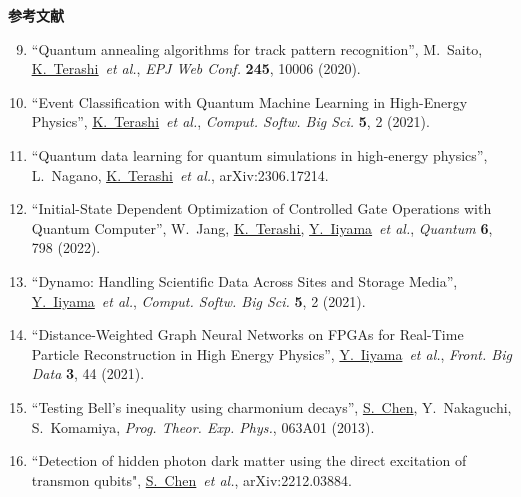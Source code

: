 \documentclass[11pt,a4j,dvipdfmx]{jarticle} 					%
\newcommand{\研究課題名}{誤り耐性量子コンピュータに向けた誤り訂正技術の開発(仮)}
\newcommand{\研究機関名}{東京大学}
\newcommand{\研究代表者氏名}{寺師弘二}
\newcommand{\me}{\underline{\underline{K.~Terashi}}}
\newcommand{\研究期間の最終元号年度}{10}  %
\newcommand{\iiyama}{\underline{Y.~Iiyama}}
\newcommand{\chen}{\underline{S.~Chen}}
\begin{document}
\vspace*{1zw}
\noindent\textbf{参考文献} \vspace{-2mm}
\begin{enumerate}
	\setcounter{enumi}{8}
	\renewcommand{\labelenumi}{[\arabic{enumi}]}
	\item \label{Saito_CHEP} ``Quantum annealing algorithms for track pattern recognition'',
		M.~Saito, \me\ {\it et al.}, {\it EPJ Web Conf.} {\bf 245}, 10006 (2020).\vspace{-3mm}
	\item \label{Terashi_QML_selection} ``Event Classification with Quantum Machine Learning in High-Energy Physics'', 
		\me\ {\it et al.}, {\it Comput. Softw. Big Sci.} {\bf 5}, 2 (2021).\vspace{-3mm}
	\item \label{Terashi_QML_Qdata} ``Quantum data learning for quantum simulations in high-energy physics'', 
	L.~Nagano, \me\ {\it et al.}, arXiv:2306.17214.\vspace{-3mm}
	\item \label{Terashi_AQCEL} ``Initial-State Dependent Optimization of Controlled Gate Operations with Quantum Computer'', 
		W.~Jang, \me, \iiyama\  {\it et al.}, {\it Quantum} {\bf 6}, 798 (2022).\vspace{-3mm}	
	\item \label{Iiyama_Dynamo} ``Dynamo: Handling Scientific Data Across Sites and Storage Media'',
		\iiyama\ {\it et al.},  {\it Comput. Softw. Big Sci.} {\bf 5}, 2 (2021).\vspace{-3mm}
	\item \label{Iiyama_GNN} ``Distance-Weighted Graph Neural Networks on FPGAs for Real-Time Particle Reconstruction in High Energy Physics'',
		\iiyama\ {\it et al.}, {\it Front. Big Data} {\bf 3}, 44 (2021).\vspace{-3mm}
	\item \label{Chen_QM} ``Testing Bell's inequality using charmonium decays'', 
		\chen, Y.~Nakaguchi, S.~Komamiya, {\it Prog. Theor. Exp. Phys.}, 063A01 (2013).\vspace{-3mm}
	\item \label{Chen_DM} ``Detection of hidden photon dark matter using the direct excitation of transmon qubits",
		\chen\ {\it et al.}, arXiv:2212.03884.
\end{enumerate}
\end{document}
